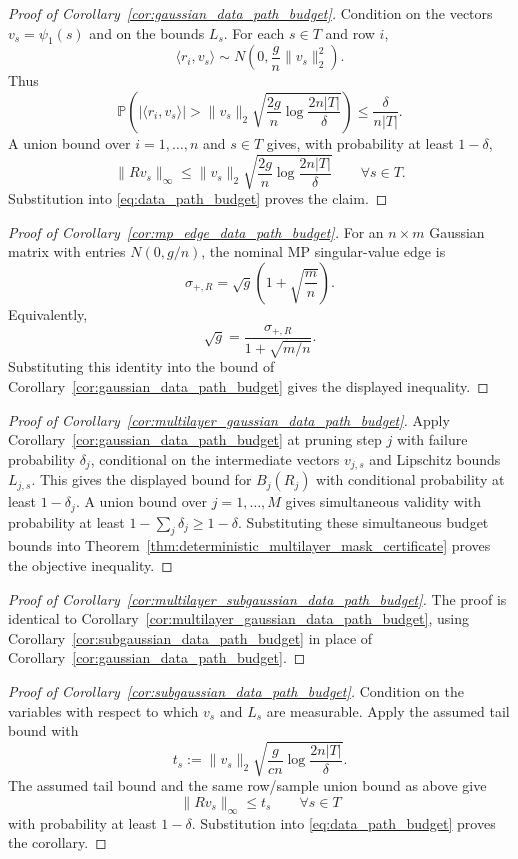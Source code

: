\documentclass[11pt]{article}
\theoremstyle{plain}
\theoremstyle{definition}
\theoremstyle{remark}
\newcommand{\PP}{\mathbb{P}}
\newcommand{\1}{\mathbf{1}}
\begin{document}
\begin{proof}[Proof of Corollary~\ref{cor:gaussian_data_path_budget}]
Condition on the vectors \(v_s=\psi_1(s)\) and on the bounds \(L_s\). For each \(s\in T\) and row \(i\),
\[
\langle r_i,v_s\rangle\sim N\!\left(0,\frac{g}{n}\|v_s\|_2^2\right).
\]
Thus
\[
\PP\!\left(
|\langle r_i,v_s\rangle|
>
\|v_s\|_2\sqrt{\frac{2g}{n}\log\frac{2n|T|}{\delta}}
\right)
\le
\frac{\delta}{n|T|}.
\]
A union bound over \(i=1,\dots,n\) and \(s\in T\) gives, with probability at least \(1-\delta\),
\[
\|Rv_s\|_\infty
\le
\|v_s\|_2\sqrt{\frac{2g}{n}\log\frac{2n|T|}{\delta}}
\qquad\forall s\in T.
\]
Substitution into \eqref{eq:data_path_budget} proves the claim.
\end{proof}

\begin{proof}[Proof of Corollary~\ref{cor:mp_edge_data_path_budget}]
For an \(n\times m\) Gaussian matrix with entries \(N(0,g/n)\), the nominal MP singular-value edge is
\[
\sigma_{+,R}=\sqrt g\left(1+\sqrt{\frac{m}{n}}\right).
\]
Equivalently,
\[
\sqrt g=\frac{\sigma_{+,R}}{1+\sqrt{m/n}}.
\]
Substituting this identity into the bound of Corollary~\ref{cor:gaussian_data_path_budget} gives the displayed inequality.
\end{proof}

\begin{proof}[Proof of Corollary~\ref{cor:multilayer_gaussian_data_path_budget}]
Apply Corollary~\ref{cor:gaussian_data_path_budget} at pruning step \(j\) with failure probability \(\delta_j\), conditional on the intermediate vectors \(v_{j,s}\) and Lipschitz bounds \(L_{j,s}\). This gives the displayed bound for \(B_j(R_j)\) with conditional probability at least \(1-\delta_j\). A union bound over \(j=1,\dots,M\) gives simultaneous validity with probability at least \(1-\sum_j\delta_j\ge1-\delta\). Substituting these simultaneous budget bounds into Theorem~\ref{thm:deterministic_multilayer_mask_certificate} proves the objective inequality.
\end{proof}

\begin{proof}[Proof of Corollary~\ref{cor:multilayer_subgaussian_data_path_budget}]
The proof is identical to Corollary~\ref{cor:multilayer_gaussian_data_path_budget}, using Corollary~\ref{cor:subgaussian_data_path_budget} in place of Corollary~\ref{cor:gaussian_data_path_budget}.
\end{proof}

\begin{proof}[Proof of Corollary~\ref{cor:subgaussian_data_path_budget}]
Condition on the variables with respect to which \(v_s\) and \(L_s\) are measurable.
Apply the assumed tail bound with
\[
t_s:=\|v_s\|_2\sqrt{\frac{g}{c n}\log\frac{2n|T|}{\delta}}.
\]
The assumed tail bound and the same row/sample union bound as above give
\[
\|Rv_s\|_\infty\le t_s
\qquad\forall s\in T
\]
with probability at least \(1-\delta\). Substitution into \eqref{eq:data_path_budget} proves the corollary.
\end{proof}
\end{document}
